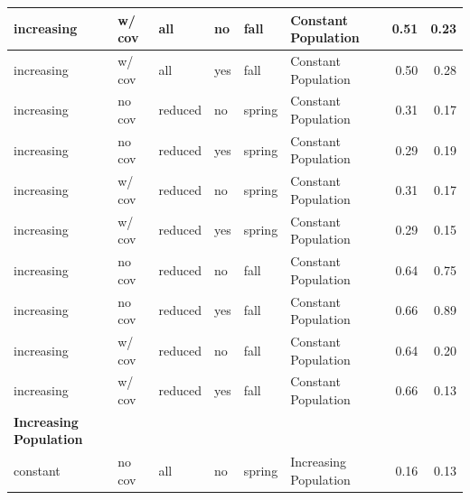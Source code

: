 \documentclass[
  12pt,
]{article}
\begin{document}
\begin{table}
\begin{tabular}{l|l|l|l|l|l|r|r}
\hline
\hspace{1em}\hspace{1em}increasing & w/ cov & all & no & fall & Constant Population & 0.51 & 0.23\\
\hline
\hspace{1em}\hspace{1em}increasing & w/ cov & all & yes & fall & Constant Population & 0.50 & 0.28\\
\hline
\hspace{1em}\hspace{1em}increasing & no cov & reduced & no & spring & Constant Population & 0.31 & 0.17\\
\hline
\hspace{1em}\hspace{1em}increasing & no cov & reduced & yes & spring & Constant Population & 0.29 & 0.19\\
\hline
\hspace{1em}\hspace{1em}increasing & w/ cov & reduced & no & spring & Constant Population & 0.31 & 0.17\\
\hline
\hspace{1em}\hspace{1em}increasing & w/ cov & reduced & yes & spring & Constant Population & 0.29 & 0.15\\
\hline
\hspace{1em}\hspace{1em}increasing & no cov & reduced & no & fall & Constant Population & 0.64 & 0.75\\
\hline
\hspace{1em}\hspace{1em}increasing & no cov & reduced & yes & fall & Constant Population & 0.66 & 0.89\\
\hline
\hspace{1em}\hspace{1em}increasing & w/ cov & reduced & no & fall & Constant Population & 0.64 & 0.20\\
\hline
\hspace{1em}\hspace{1em}increasing & w/ cov & reduced & yes & fall & Constant Population & 0.66 & 0.13\\
\hline
\multicolumn{1}{l}{\textbf{Increasing Population}}\\
\hline
\hspace{1em}\hspace{1em}constant & no cov & all & no & spring & Increasing Population & 0.16 & 0.13\\

\end{tabular}
\end{table}
\end{document}
